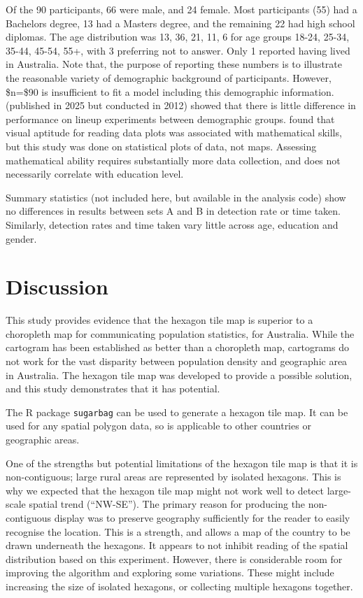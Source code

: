 \documentclass[
doublespace,
  times]{anzsauth}
\begin{document}
Of the 90 participants, 66 were male, and 24 female. Most participants
(55) had a Bachelors degree, 13 had a Masters degree, and the remaining
22 had high school diplomas. The age distribution was 13, 36, 21, 11, 6
for age groups 18-24, 25-34, 35-44, 45-54, 55+, with 3 preferring not to
answer. Only 1 reported having lived in Australia. Note that, the
purpose of reporting these numbers is to illustrate the reasonable
variety of demographic background of participants. However, \$n=\$90 is
insufficient to fit a model including this demographic information.
\citet{MHC} (published in 2025 but conducted in 2012) showed that there
is little difference in performance on lineup experiments between
demographic groups. \citet{VH2016} found that visual aptitude for
reading data plots was associated with mathematical skills, but this
study was done on statistical plots of data, not maps. Assessing
mathematical ability requires substantially more data collection, and
does not necessarily correlate with education level.

Summary statistics (not included here, but available in the analysis
code) show no differences in results between sets A and B in detection
rate or time taken. Similarly, detection rates and time taken vary
little across age, education and gender.

\section{Discussion}\label{discussion}

This study provides evidence that the hexagon tile map is superior to a
choropleth map for communicating population statistics, for Australia.
While the cartogram has been established as better than a choropleth
map, cartograms do not work for the vast disparity between population
density and geographic area in Australia. The hexagon tile map was
developed to provide a possible solution, and this study demonstrates
that it has potential.

The R package \texttt{sugarbag} can be used to generate a hexagon tile
map. It can be used for any spatial polygon data, so is applicable to
other countries or geographic areas.

One of the strengths but potential limitations of the hexagon tile map
is that it is non-contiguous; large rural areas are represented by
isolated hexagons. This is why we expected that the hexagon tile map
might not work well to detect large-scale spatial trend (``NW-SE''). The
primary reason for producing the non-contiguous display was to preserve
geography sufficiently for the reader to easily recognise the location.
This is a strength, and allows a map of the country to be drawn
underneath the hexagons. It appears to not inhibit reading of the
spatial distribution based on this experiment. However, there is
considerable room for improving the algorithm and exploring some
variations. These might include increasing the size of isolated
hexagons, or collecting multiple hexagons together.
\end{document}
